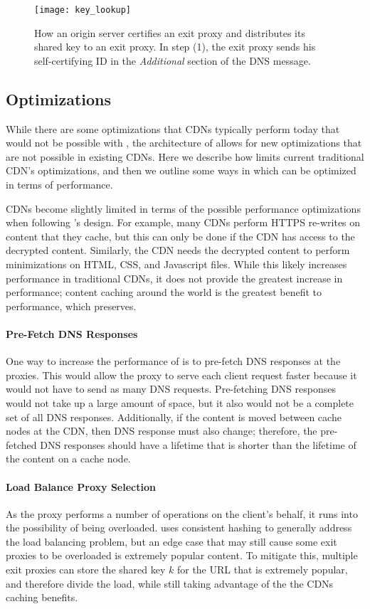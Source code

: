 \begin{figure}[t]
\centering
\texttt{[image: key\_lookup]}
\caption{How an origin server certifies an exit proxy and distributes its shared key to an exit proxy.  In step (1), 
the exit proxy sends his self-certifying ID in the {\it Additional} section of the DNS message.  }
\label{fig:keys}
\end{figure}

\subsection{Optimizations}
\label{sec:optimizations}
While there are some optimizations that CDNs typically perform today that would not be possible with \system{}, the architecture 
of \system{} allows for new optimizations that are not possible in existing CDNs.  Here we describe how \system{} limits 
current traditional CDN's optimizations, and then we outline some ways in which \system{} 
can be optimized in terms of performance.

CDNs become slightly limited in terms of the possible performance optimizations when following \system{}'s design.  For example, 
many CDNs perform HTTPS re-writes on content that they cache, but this can only be done if the CDN has access to the 
decrypted content.  Similarly, the CDN needs the decrypted content to perform minimizations on HTML, CSS, and Javascript 
files.  While this likely increases performance in traditional CDNs, it does not provide the greatest increase in performance; 
content caching around the world is the greatest benefit to performance, which \system{} preserves.

\paragraph{Pre-Fetch DNS Responses} One way to increase the performance of \system{} is to pre-fetch DNS responses at 
the proxies.  This would allow the proxy to serve each client request faster because it would not have to send 
as many DNS requests.  Pre-fetching DNS responses would not take up a large amount of space, but it also 
would not be a complete set of all DNS responses.  Additionally, if the content is moved between cache nodes 
at the CDN, then DNS response must also change; therefore, the pre-fetched DNS responses should have a 
lifetime that is shorter than the lifetime of the content on a cache node.

\paragraph{Load Balance Proxy Selection} As the proxy performs a number of operations on the client's behalf, it 
runs into the possibility of being overloaded.  \system{} uses consistent hashing to generally address the load balancing 
problem, but an edge case that may still cause some exit proxies to be overloaded is extremely popular content.  To mitigate this, 
multiple exit proxies can store the shared key $k$ for the URL that is extremely popular, and therefore divide the load, while 
still taking advantage of the the CDNs caching benefits.  

